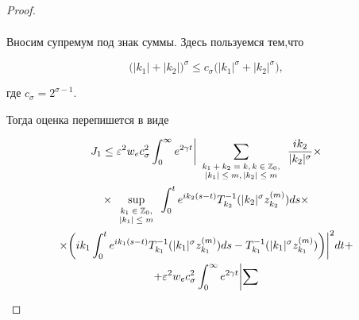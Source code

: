 \begin{proof}
\begin{multline*}
\end{multline*}

Вносим супремум под знак суммы. Здесь пользуемся тем,что 

\begin{equation}

\bigl(|k_1|+|k_2| \bigr)^{\sigma}\le c_\sigma \bigl(|k_1|^{\sigma}+|k_2|^{\sigma}\bigr)

\label{duh:estk_1+k_2},

\end{equation}

где $c_\sigma=2^{\sigma-1}$. 

Тогда оценка перепишется в виде

\begin{multline*} 

J_1\le \varepsilon^2 w_e c_\sigma^2\int_0^\infty e^{2\gamma t} 

\biggl|

\sum_{

\scriptsize

\begin{array}{c}

k_1+k_2=k, k\in \mathbb Z_0, \\

|k_1|\le m,|k_2|\le m

\end{array}

}\frac{ik_2}{|k_2|^\sigma} \times 

\\ 

\times \sup_{\scriptsize \begin{array}{c} k_1\in \mathbb Z_0, \\ |k_1|\le m \end{array}} \int_0^t e^{ik_2(s-t)}T^{-1}_{k_2}(|k_2|^\sigma z_{k_2}^{(m)})ds \times

\\

\times

\biggl(

ik_1\int_0^t e^{ik_1(s-t)}T^{-1}_{k_1}(|k_1|^\sigma z_{k_1}^{(m)})ds-T^{-1}_{k_1}(|k_1|^\sigma z_{k_1}^{(m)})

\biggr)\biggr|^2dt+

\\

+\varepsilon^2 w_e c_\sigma^2\int_0^\infty e^{2\gamma t} 

\biggl|

\sum_{

}
\end{multline*}
\end{proof}
